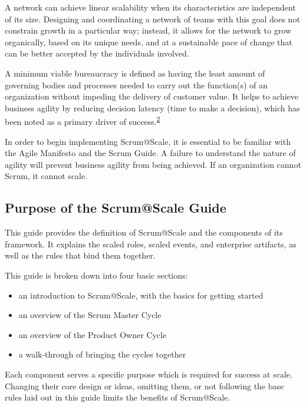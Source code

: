 \documentclass[12pt,a4paper,parskip=full]{scrartcl}
\begin{document}
A network can achieve linear scalability when its characteristics are
independent of its size. Designing and coordinating a network of teams
with this goal does not constrain growth in a particular way; instead,
it allows for the network to grow organically, based on its unique
needs, and at a sustainable pace of change that can be better accepted
by the individuals involved.

A minimum viable bureaucracy is defined as having the least amount of
governing bodies and processes needed to carry out the function(s) of an
organization without impeding the delivery of customer value. It helps
to achieve business agility by reducing decision latency (time to make a
decision), which has been noted as a primary driver of
success.\textsuperscript{\hyperref[citation2]{2}}

In order to begin implementing Scrum@Scale, it is essential to be
familiar with the Agile Manifesto and the Scrum Guide. A failure to
understand the nature of agility will prevent business agility from
being achieved. If an organization cannot Scrum, it cannot scale.

\subsection{Purpose of the Scrum@Scale
Guide}\label{purpose-of-the-ScrumatScale-guide}

This guide provides the definition of Scrum@Scale and the components of
its framework. It explains the scaled roles, scaled events, and
enterprise artifacts, as well as the rules that bind them together.

This guide is broken down into four basic sections:

\begin{itemize}
\itemsep1pt\parskip0pt
\item
  an introduction to Scrum@Scale, with the basics for getting started
\item
  an overview of the Scrum Master Cycle
\item
  an overview of the Product Owner Cycle
\item
  a walk-through of bringing the cycles together
\end{itemize}

Each component serves a specific purpose which is required for success
at scale. Changing their core design or ideas, omitting them, or not
following the base rules laid out in this guide limits the benefits of
Scrum@Scale.
\end{document}
